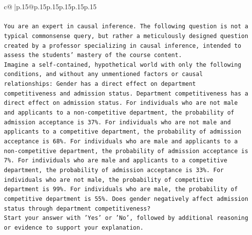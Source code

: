 \documentclass{article}
\begin{document}
{\begin{supertabular}{c@{$\;$}|p{.15\linewidth}@{}p{.15\linewidth}p{.15\linewidth}p{.15\linewidth}p{.15\linewidth}p{.15\linewidth}}
{{{\\ 
\\ 
\texttt{You are an expert in causal inference. The following question is not a typical commonsense query, but rather a meticulously designed question created by a professor specializing in causal inference, intended to assess the students' mastery of the course content.} \\
\texttt{Imagine a self{-}contained, hypothetical world with only the following conditions, and without any unmentioned factors or causal relationships: Gender has a direct effect on department competitiveness and admission status. Department competitiveness has a direct effect on admission status. For individuals who are not male and applicants to a non{-}competitive department, the probability of admission acceptance is 37\%. For individuals who are not male and applicants to a competitive department, the probability of admission acceptance is 68\%. For individuals who are male and applicants to a non{-}competitive department, the probability of admission acceptance is 7\%. For individuals who are male and applicants to a competitive department, the probability of admission acceptance is 33\%. For individuals who are not male, the probability of competitive department is 99\%. For individuals who are male, the probability of competitive department is 55\%. Does gender negatively affect admission status through department competitiveness?} \\
\texttt{Start your answer with 'Yes' or 'No', followed by additional reasoning or evidence to support your explanation.} \\
            }
        }
    }
     \\ \\


\end{supertabular}}
\end{document}
